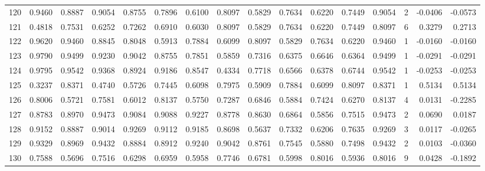 \begin{tabular}{lrrrrrrrrrrrrrrr}
120 &      0.9460 &  0.8887 &  0.9054 &  0.8755 &  0.7896 &  0.6100 &  0.8097 &  0.5829 &  0.7634 &  0.6220 &   0.7449 &     0.9054 &      2 &                   -0.0406 &                    -0.0573 \\
121 &      0.4818 &  0.7531 &  0.6252 &  0.7262 &  0.6910 &  0.6030 &  0.8097 &  0.5829 &  0.7634 &  0.6220 &   0.7449 &     0.8097 &      6 &                    0.3279 &                     0.2713 \\
122 &      0.9620 &  0.9460 &  0.8845 &  0.8048 &  0.5913 &  0.7884 &  0.6099 &  0.8097 &  0.5829 &  0.7634 &   0.6220 &     0.9460 &      1 &                   -0.0160 &                    -0.0160 \\
123 &      0.9790 &  0.9499 &  0.9230 &  0.9042 &  0.8755 &  0.7851 &  0.5859 &  0.7316 &  0.6375 &  0.6646 &   0.6364 &     0.9499 &      1 &                   -0.0291 &                    -0.0291 \\
124 &      0.9795 &  0.9542 &  0.9368 &  0.8924 &  0.9186 &  0.8547 &  0.4334 &  0.7718 &  0.6566 &  0.6378 &   0.6744 &     0.9542 &      1 &                   -0.0253 &                    -0.0253 \\
125 &      0.3237 &  0.8371 &  0.4740 &  0.5726 &  0.7445 &  0.6098 &  0.7975 &  0.5909 &  0.7884 &  0.6099 &   0.8097 &     0.8371 &      1 &                    0.5134 &                     0.5134 \\
126 &      0.8006 &  0.5721 &  0.7581 &  0.6012 &  0.8137 &  0.5750 &  0.7287 &  0.6846 &  0.5884 &  0.7424 &   0.6270 &     0.8137 &      4 &                    0.0131 &                    -0.2285 \\
127 &      0.8783 &  0.8970 &  0.9473 &  0.9084 &  0.9088 &  0.9227 &  0.8778 &  0.8630 &  0.6864 &  0.5856 &   0.7515 &     0.9473 &      2 &                    0.0690 &                     0.0187 \\
128 &      0.9152 &  0.8887 &  0.9014 &  0.9269 &  0.9112 &  0.9185 &  0.8698 &  0.5637 &  0.7332 &  0.6206 &   0.7635 &     0.9269 &      3 &                    0.0117 &                    -0.0265 \\
129 &      0.9329 &  0.8969 &  0.9432 &  0.8884 &  0.8912 &  0.9240 &  0.9042 &  0.8761 &  0.7545 &  0.5880 &   0.7498 &     0.9432 &      2 &                    0.0103 &                    -0.0360 \\
130 &      0.7588 &  0.5696 &  0.7516 &  0.6298 &  0.6959 &  0.5958 &  0.7746 &  0.6781 &  0.5998 &  0.8016 &   0.5936 &     0.8016 &      9 &                    0.0428 &                    -0.1892 \\

\end{tabular}
